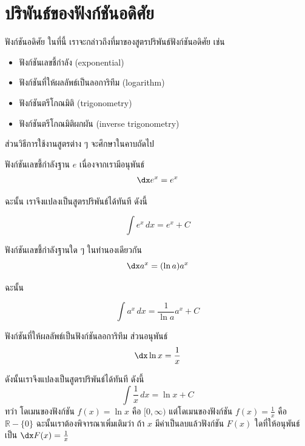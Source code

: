 \section[อดิศัย]{ปริพันธ์ของฟังก์ชันอดิศัย}
\frame{\sectionpage}

\begin{frame}{ฟังก์ชันอดิศัย}
ในที่นี้ เราจะกล่าวถึงที่มาของสูตรปริพันธ์ฟังก์ชันอดิศัย เช่น
\begin{itemize}
\item ฟังก์ชันเลขชี้กำลัง (exponential)
\item ฟังก์ชันที่ให้ผลลัพธ์เป็นลอการิทึม (logarithm)
\item ฟังก์ชันตรีโกณมิติ (trigonometry)
\item ฟังก์ชันตรีโกณมิติผกผัน (inverse trigonometry)
\end{itemize}
ส่วนวิธีการใช้งานสูตรต่าง ๆ จะศึกษาในคาบถัดไป
\end{frame}

\begin{frame}[t]{ฟังก์ชันเลขชี้กำลังฐาน $e$}
เนื่องจากเรามีอนุพันธ์
\[ \dx e^x = e^x \]
\begin{slide}
ฉะนั้น เราจึงแปลงเป็นสูตรปริพันธ์ได้ทันที ดังนี้
\begin{remark}{}
\[ \int e^x \, dx = e^x + C\]
\end{remark}
\end{slide}
\end{frame}

\begin{frame}[t]{ฟังก์ชันเลขชี้กำลังฐานใด ๆ}
ในทำนองเดียวกัน
\[ \dx a^x = (\ln a) a^x \]
\begin{slide}
ฉะนั้น
\begin{remark}{}
\[ \int a^x \, dx = \frac{1}{\ln a}a^x + C\]
\end{remark}
\end{slide}
\end{frame}

\begin{frame}[t]{ฟังก์ชันที่ให้ผลลัพธ์เป็นฟังก์ชันลอการิทึม}
ส่วนอนุพันธ์
\[ \dx \ln x = \frac{1}{x} \]
\begin{slide}
ดังนั้นเราจึงแปลงเป็นสูตรปริพันธ์ได้ทันที ดังนี้
\[ \int \frac{1}{x} \, dx = \ln x + C\]
ทว่า โดเมนของฟังก์ชัน $f(x) = \ln x$ คือ $[0, \infty)$ แต่โดเมนของฟังก์ชัน $f(x) = \frac{1}{x}$ คือ $\mathbb{R} - \{0\}$ ฉะนั้นเราต้องพิจารณาเพิ่มเติมว่า ถ้า $x$ มีค่าเป็นลบแล้วฟังก์ชัน $F(x)$ ใดที่ให้อนุพันธ์เป็น $\dx F(x) = \frac{1}{x}$
\end{slide}
\end{frame}

